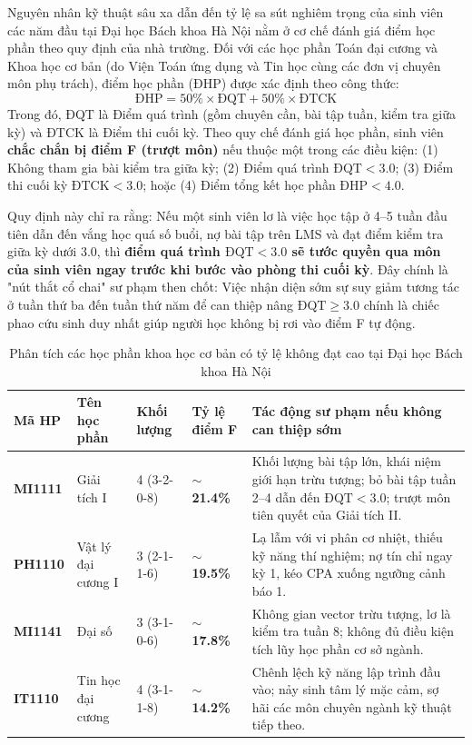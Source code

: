 Nguyên nhân kỹ thuật sâu xa dẫn đến tỷ lệ sa sút nghiêm trọng của sinh viên các năm đầu tại Đại học Bách khoa Hà Nội nằm ở cơ chế đánh giá điểm học phần theo quy định của nhà trường. Đối với các học phần Toán đại cương và Khoa học cơ bản (do Viện Toán ứng dụng và Tin học cùng các đơn vị chuyên môn phụ trách), điểm học phần ($\text{ĐHP}$) được xác định theo công thức:
\begin{equation}
\text{ĐHP} = 50\% \times \text{ĐQT} + 50\% \times \text{ĐTCK}
\end{equation}
Trong đó, $\text{ĐQT}$ là Điểm quá trình (gồm chuyên cần, bài tập tuần, kiểm tra giữa kỳ) và $\text{ĐTCK}$ là Điểm thi cuối kỳ. Theo quy chế đánh giá học phần, sinh viên \textbf{chắc chắn bị điểm F (trượt môn)} nếu thuộc một trong các điều kiện: (1) Không tham gia bài kiểm tra giữa kỳ; (2) Điểm quá trình $\text{ĐQT} < 3.0$; (3) Điểm thi cuối kỳ $\text{ĐTCK} < 3.0$; hoặc (4) Điểm tổng kết học phần $\text{ĐHP} < 4.0$.

Quy định này chỉ ra rằng: Nếu một sinh viên lơ là việc học tập ở 4--5 tuần đầu tiên dẫn đến vắng học quá số buổi, nợ bài tập trên LMS và đạt điểm kiểm tra giữa kỳ dưới 3.0, thì \textbf{điểm quá trình $\text{ĐQT} < 3.0$ sẽ tước quyền qua môn của sinh viên ngay trước khi bước vào phòng thi cuối kỳ}. Đây chính là "nút thắt cổ chai" sư phạm then chốt: Việc nhận diện sớm sự suy giảm tương tác ở tuần thứ ba đến tuần thứ năm để can thiệp nâng $\text{ĐQT} \ge 3.0$ chính là chiếc phao cứu sinh duy nhất giúp người học không bị rơi vào điểm F tự động.

\begin{table}[htbp]
\centering
\caption{Phân tích các học phần khoa học cơ bản có tỷ lệ không đạt cao tại Đại học Bách khoa Hà Nội}
\label{tab:mon_hoc_co_ban}
\vspace{0.2cm}
\begin{tabularx}{\textwidth}{|C{1.8cm}|L{3.2cm}|C{2.0cm}|C{1.8cm}|Y|}
\hline
\textbf{Mã HP} & \textbf{Tên học phần} & \textbf{Khối lượng} & \textbf{Tỷ lệ điểm F} & \textbf{Tác động sư phạm nếu không can thiệp sớm} \\
\hline
\textbf{MI1111} & Giải tích I & 4 (3-2-0-8) & $\sim$\textbf{21.4\%} & Khối lượng bài tập lớn, khái niệm giới hạn trừu tượng; bỏ bài tập tuần 2--4 dẫn đến $\text{ĐQT} < 3.0$; trượt môn tiên quyết của Giải tích II. \\
\hline
\textbf{PH1110} & Vật lý đại cương I & 3 (2-1-1-6) & $\sim$\textbf{19.5\%} & Lạ lẫm với vi phân cơ nhiệt, thiếu kỹ năng thí nghiệm; nợ tín chỉ ngay kỳ 1, kéo CPA xuống ngưỡng cảnh báo 1. \\
\hline
\textbf{MI1141} & Đại số & 3 (3-1-0-6) & $\sim$\textbf{17.8\%} & Không gian vector trừu tượng, lơ là kiểm tra tuần 8; không đủ điều kiện tích lũy học phần cơ sở ngành. \\
\hline
\textbf{IT1110} & Tin học đại cương & 4 (3-1-1-8) & $\sim$\textbf{14.2\%} & Chênh lệch kỹ năng lập trình đầu vào; nảy sinh tâm lý mặc cảm, sợ hãi các môn chuyên ngành kỹ thuật tiếp theo. \\
\hline
\end{tabularx}
\end{table}

